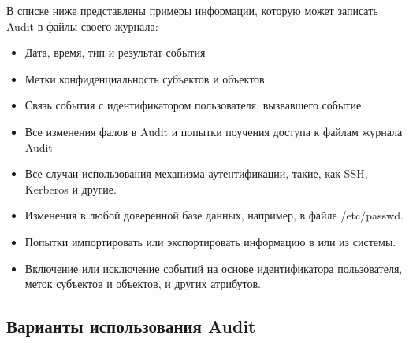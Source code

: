 \documentclass[a4paper,10pt,twoside]{article}
\begin{document}
В списке ниже представлены примеры информации, которую может записать Audit в файлы своего журнала:

\begin{itemize}
\item Дата, время, тип и результат события
\item Метки конфиденциальность субъектов и объектов
\item Связь события с идентификатором пользователя, вызвавшего событие
\item Все изменения фалов в Audit и попытки поучения доступа к файлам журнала Audit 
\item Все случаи использования механизма аутентификации, такие, как SSH, Kerberos и другие.
\item Изменения в любой доверенной базе данных, например, в файле  /etc/passwd.
\item Попытки импортировать или экспортировать информацию в или из системы.
\item Включение или исключение событий на основе идентификатора пользователя, меток субъектов и объектов, и других атрибутов.
\end{itemize}



 
\subsection{Варианты использования Audit}
\end{document}
